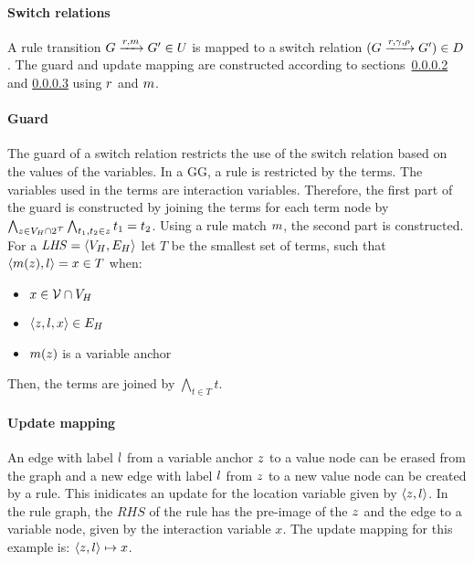 \paragraph{Switch relations}
A rule transition $G \xrightarrow{r, m} G' \in U$ is mapped to a switch relation $(G\xrightarrow{r, \gamma, \rho}G') \in D$. The guard and update mapping are constructed according to sections~\ref{sec:guards} and \ref{sec:updates} using $r$ and $m$. 

\paragraph{Guard}\label{sec:guards}
The guard of a switch relation restricts the use of the switch relation based on the values of the variables. In a GG, a rule is restricted by the terms. The variables used in the terms are interaction variables. Therefore, the first part of the guard is constructed by joining the terms for each term node by $\bigwedge_{z \in V_{H} \cap 2^{\mathcal{T}}}\bigwedge_{t_1, t_2 \in z}t_1 = t_2$. Using a rule match $m$, the second part is constructed. For a $\mathit{LHS} = \langle V_{H}, E_{H}\rangle$ let $T$ be the smallest set of terms, such that $\langle m(z), l \rangle = x \in T$ when:
\begin{itemize}
\item $x \in \mathcal{V} \cap V_{H}$
\item $\langle z, l, x\rangle \in E_{H}$
\item $m(z)$ is a variable anchor
\end{itemize}
Then, the terms are joined by $\bigwedge_{t\in T}t$.

\paragraph{Update mapping}\label{sec:updates}
An edge with label $l$ from a variable anchor $z$ to a value node can be erased from the graph and a new edge with label $l$ from $z$ to a new value node can be created by a rule. This inidicates an update for the location variable given by $\langle z, l \rangle$. In the rule graph, the $\mathit{RHS}$ of the rule has the pre-image of the $z$ and the edge to a variable node, given by the interaction variable $x$. The update mapping for this example is: $\langle z, l \rangle \mapsto x$.

